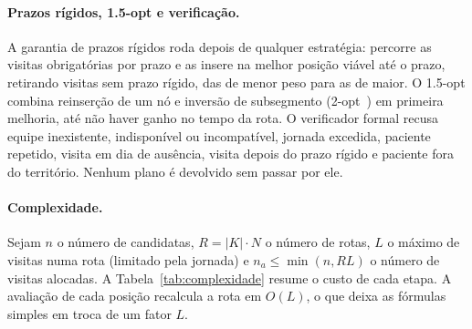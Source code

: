 \documentclass[11pt,a4paper]{article}
\begin{document}
\paragraph{Prazos rígidos, 1.5-opt e verificação.} A garantia de prazos rígidos roda depois de qualquer estratégia: percorre as visitas obrigatórias por prazo e as insere na melhor posição viável até o prazo, retirando visitas sem prazo rígido, das de menor peso para as de maior. O 1.5-opt combina reinserção de um nó e inversão de subsegmento (2-opt~\cite{croes1958}) em primeira melhoria, até não haver ganho no tempo da rota. O verificador formal recusa equipe inexistente, indisponível ou incompatível, jornada excedida, paciente repetido, visita em dia de ausência, visita depois do prazo rígido e paciente fora do território. Nenhum plano é devolvido sem passar por ele.

\paragraph{Complexidade.} Sejam $n$ o número de candidatas, $R = |K| \cdot N$ o número de rotas, $L$ o máximo de visitas numa rota (limitado pela jornada) e $n_a \le \min(n, RL)$ o número de visitas alocadas. A Tabela~\ref{tab:complexidade} resume o custo de cada etapa. A avaliação de cada posição recalcula a rota em $O(L)$, o que deixa as fórmulas simples em troca de um fator $L$.
\end{document}
